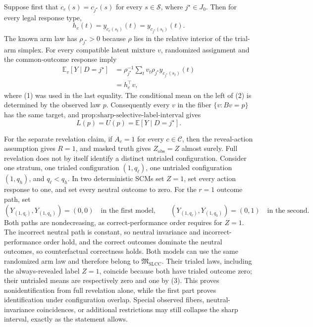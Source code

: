 Suppose first that \(c_e(s)=c_{j^\star}(s)\) for every \(s\in\mathcal S\), where \(j^\star\in J_0\).  Then for every legal response type,
\[
h_e(t)=y_{c_e(s_t)}(t)=y_{c_{j^\star}(s_t)}(t).
\tag{1}
\]
The known arm law has \(\rho_{j^\star}>0\) because \(\rho\) lies in the relative interior of the trial-arm simplex.  For every compatible latent mixture \(v\), randomized assignment and the common-outcome response imply
\[
\begin{aligned}
\mathbb E_v[Y\mid D=j^\star]
&=\rho_{j^\star}^{-1}
\sum_t v_t\rho_{j^\star}y_{c_{j^\star}(s_t)}(t)\\
&=h_e^{\top}v,
\end{aligned}
\tag{2}
\]
where (1) was used in the last equality.  The conditional mean on the left of (2) is determined by the observed law \(p\).  Consequently every \(v\) in the fiber \(\{v:Bv=p\}\) has the same target, and \(\text{prop:sharp-selective-label-interval}\) gives
\[
L(p)=U(p)=\mathbb E[Y\mid D=j^\star].
\]

For the separate revelation claim, if \(A_c=1\) for every \(c\in\mathcal C\), then the reveal-action assumption gives \(R=1\), and masked truth gives \(Z_{\mathrm{obs}}=Z\) almost surely.  Full revelation does not by itself identify a distinct untrialed configuration.  Consider one stratum, one trialed configuration \((1,q_\ell)\), one untrialed configuration \((1,q_h)\), and \(q_\ell<q_h\).  In two deterministic SCMs set \(Z=1\), set every action response to one, and set every neutral outcome to zero.  For the \(r=1\) outcome path, set
\[
(Y_{(1,q_\ell)},Y_{(1,q_h)})=(0,0)
\quad\text{in the first model},
\qquad
(Y_{(1,q_\ell)},Y_{(1,q_h)})=(0,1)
\quad\text{in the second}.
\tag{3}
\]
Both paths are nondecreasing, as correct-performance order requires for \(Z=1\).  The incorrect neutral path is constant, so neutral invariance and incorrect-performance order hold, and the correct outcomes dominate the neutral outcomes, so counterfactual correctness holds.  Both models can use the same randomized arm law and therefore belong to \(\mathfrak M_{\mathrm{SLCC}}\).  Their trialed laws, including the always-revealed label \(Z=1\), coincide because both have trialed outcome zero; their untrialed means are respectively zero and one by (3).  This proves nonidentification from full revelation alone, while the first part proves identification under configuration overlap.  Special observed fibers, neutral-invariance coincidences, or additional restrictions may still collapse the sharp interval, exactly as the statement allows.